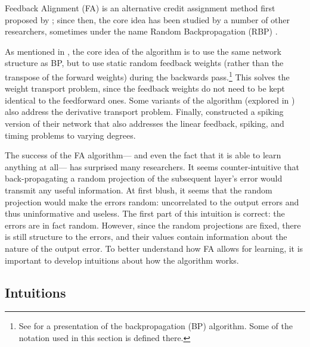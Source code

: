 Feedback Alignment (FA) is an alternative credit assignment method
first proposed by \textcite{Lillicrap2014};
since then, the core idea has been studied by a number of other researchers,
sometimes under the name Random Backpropagation (RBP) \parencite[\eg/][]{Liao2015,Baldi2016,Nokland2016}.

As mentioned in ,
the core idea of the algorithm is to use the same network structure as BP,
but to use static random feedback weights
(rather than the transpose of the forward weights)
during the backwards pass.\footnote{
  See  for a presentation of the backpropagation (BP) algorithm.
  Some of the notation used in this section is defined there.}
This solves the weight transport problem,
since the feedback weights do not need to be kept identical to the feedforward ones.
Some variants of the algorithm (explored in )
also address the derivative transport problem.
Finally, \textcite{Lillicrap2016} constructed a spiking version of their network
that also addresses the linear feedback, spiking, and timing problems
to varying degrees.

The success of the FA algorithm---%
and even the fact that it is able to learn anything at all---%
has surprised many researchers.
It seems counter-intuitive that back-propagating a random projection
of the subsequent layer's error
would transmit any useful information.
At first blush, it seems that the random projection would make the errors random:
uncorrelated to the output errors and thus uninformative and useless.
The first part of this intuition is correct:
the errors are in fact random.
However, since the random projections are fixed,
there is still structure to the errors,
and their values contain information about the nature of the output error.
To better understand how FA allows for learning,
it is important to develop intuitions about how the algorithm works.


\subsection{Intuitions}

